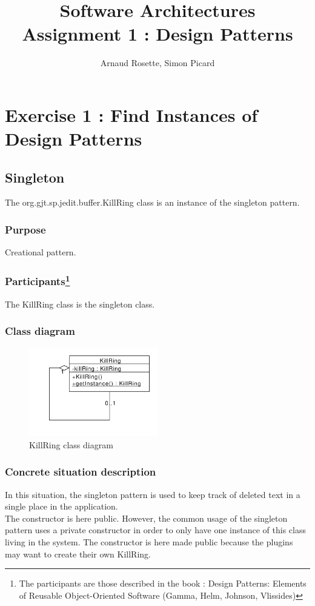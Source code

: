 \documentclass[a4paper,10pt]{article}
\title{Software Architectures\\ Assignment 1 : Design Patterns}
\author{Arnaud Rosette, Simon Picard}
\begin{document}
\maketitle%
\section{Exercise 1 : Find Instances of Design Patterns}
\subsection{Singleton}%
The org.gjt.sp.jedit.buffer.KillRing class is an instance of the singleton pattern.

\subsubsection{Purpose}
Creational pattern.
\subsubsection[Participants]{Participants\footnote[1]{The participants are those described in the book : Design Patterns: Elements of Reusable Object-Oriented Software (Gamma, Helm, Johnson, Vlissides)}}
The KillRing class is the singleton class.
\subsubsection{Class diagram}
\begin{center}
\begin{figure}[h]
  \centerline{\includegraphics[width=0.5\textwidth]{singleton-killring-class-diagram.pdf}}
  \caption{KillRing class diagram}
\end{figure}
\end{center}
\subsubsection{Concrete situation description}
In this situation, the singleton pattern is used to keep track of deleted text in a single place in the application.\\
The constructor is here public. However, the common usage of the singleton pattern uses a private constructor in order to only have one instance of this class living in the system. The constructor is here made public because the plugins may want to create their own KillRing. 
\end{document}
